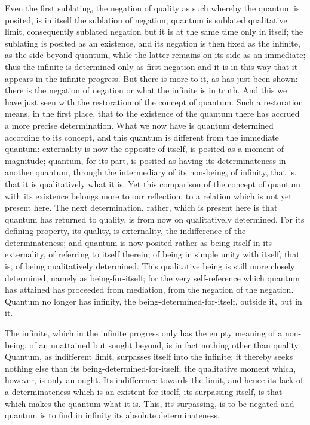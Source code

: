 Even the first sublating, the negation of quality as such
whereby the quantum is posited,
is in itself the sublation of negation;
quantum is sublated qualitative limit,
consequently sublated negation
but it is at the same time only in itself;
the sublating is posited as an existence,
and its negation is then fixed as the infinite,
as the side beyond quantum,
while the latter remains on its side as an immediate;
thus the infinite is determined only as first negation
and it is in this way that it appears in the infinite progress.
But there is more to it, as has just been shown:
there is the negation of negation
or what the infinite is in truth.
And this we have just seen with
the restoration of the concept of quantum.
Such a restoration means, in the first place,
that to the existence of the quantum
there has accrued a more precise determination.
What we now have is quantum determined
according to its concept,
and this quantum is different from the immediate quantum:
externality is now the opposite of itself,
is posited as a moment of magnitude;
quantum, for its part, is posited as
having its determinateness in another quantum,
through the intermediary of its non-being,
of infinity, that is, that it is qualitatively what it is.
Yet this comparison of the concept of quantum
with its existence belongs more to our reflection,
to a relation which is not yet present here.
The next determination, rather, which is present here is
that quantum has returned to quality, is from now on
qualitatively determined.
For its defining property, its quality, is externality,
the indifference of the determinateness;
and quantum is now posited rather
as being itself in its externality,
of referring to itself therein,
of being in simple unity with itself,
that is, of being qualitatively determined.
This qualitative being is still more closely determined,
namely as being-for-itself;
for the very self-reference
which quantum has attained
has proceeded from mediation,
from the negation of the negation.
Quantum no longer has infinity,
the being-determined-for-itself,
outside it, but in it.

The infinite, which in the infinite progress only has
the empty meaning of a non-being,
of an unattained but sought beyond,
is in fact nothing other than quality.
Quantum, as indifferent limit, surpasses itself into the infinite;
it thereby seeks nothing else than its being-determined-for-itself,
the qualitative moment which, however, is only an ought.
Its indifference towards the limit,
and hence its lack of a determinateness
which is an existent-for-itself, its surpassing itself,
is that which makes the quantum what it is.
This, its surpassing, is to be negated
and quantum is to find in infinity its absolute determinateness.

